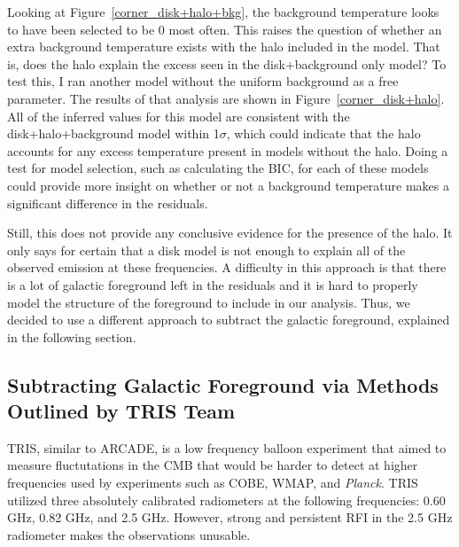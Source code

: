 \documentclass[letterpaper, 10pt]{article}
\begin{document}
Looking at Figure~\ref{corner_disk+halo+bkg}, the background temperature looks to have been selected to be 0 most often. This raises the question of whether an extra background temperature exists with the halo included in the model. That is, does the halo explain the excess seen in the disk+background only model? To test this, I ran another model without the uniform background as a free parameter. The results of that analysis are shown in Figure~\ref{corner_disk+halo}. All of the inferred values for this model are consistent with the disk+halo+background model within 1$\sigma$, which could indicate that the halo accounts for any excess temperature present in models without the halo. Doing a test for model selection, such as calculating the BIC, for each of these models could provide more insight on whether or not a background temperature makes a significant difference in the residuals. 

Still, this does not provide any conclusive evidence for the presence of the halo. It only says for certain that a disk model is not enough to explain all of the observed emission at these frequencies. A difficulty in this approach is that there is a lot of galactic foreground left in the residuals and it is hard to properly model the structure of the foreground to include in our analysis. Thus, we decided to use a different approach to subtract the galactic foreground, explained in the following section.

\subsection{Subtracting Galactic Foreground via Methods Outlined by TRIS Team}
TRIS, similar to ARCADE, is a low frequency balloon experiment that aimed to measure fluctutations in the CMB that would be harder to detect at higher frequencies used by experiments such as COBE, WMAP, and \emph{Planck}. TRIS utilized three absolutely calibrated radiometers at the following frequencies: 0.60 GHz, 0.82 GHz, and 2.5 GHz. However, strong and persistent RFI in the 2.5 GHz radiometer makes the observations unusable. 
\end{document}
